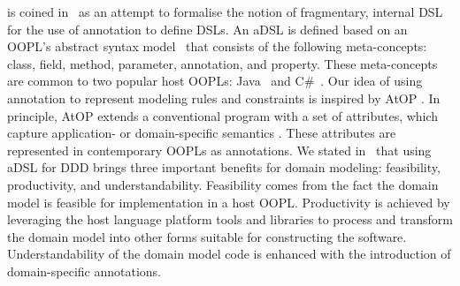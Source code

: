  is coined in~\cite{nosal_language_2016} as an attempt to formalise the notion of fragmentary, internal DSL~\cite{fowler_domain-specific_2010} for the use of annotation to define DSLs. An aDSL is defined based on an OOPL's abstract syntax model~\cite{le_domain_2018} that consists of the following meta-concepts: class, field, method, parameter, annotation, and property. These meta-concepts are common to two popular host OOPLs: Java~\cite{gosling_java_2014} and C\#~\cite{hejlsberg_c_2010}. %
Our idea of using annotation to represent modeling rules and constraints is inspired by AtOP \cite{wada_modeling_2005, cepa_representing_2005,sulir_recording_2016,balz_embedding_2012}. In principle, AtOP extends a conventional program with a set of attributes, which capture application- or domain-specific semantics \cite{cepa_representing_2005}. These attributes are represented in contemporary OOPLs as annotations. 
%
We stated in~\cite{le_domain_2018} that using aDSL for DDD brings three important benefits for domain modeling: feasibility, productivity, and understandability. Feasibility comes from the fact the domain model is feasible for implementation in a host OOPL. Productivity is achieved by leveraging the host language platform tools and libraries to process and transform the domain model into other forms suitable for constructing the software. Understandability of the domain model code is enhanced with the introduction of domain-specific annotations.


